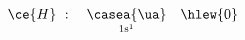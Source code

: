 \documentclass[a4paper, 10pt, final, garamond]{book}
\begin{document}
\begin{gather*}
	\ce{H}~:
	\quad
	\underset{\rm 1s^1}{\casea{\ua}}
	\quad
	\hlew{0}
	\\
\end{gather*}
\end{document}
